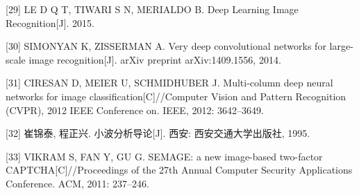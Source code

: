 \documentclass[bachelor,zhspacing]{cqu}  %
\begin{document}
\hypertarget{ref-le2015deep}{}
{[}29{]} LE D Q T, TIWARI S N, MERIALDO B. Deep Learning Image
Recognition{[}J{]}. 2015.

\hypertarget{ref-simonyan2014very}{}
{[}30{]} SIMONYAN K, ZISSERMAN A. Very deep convolutional networks for
large-scale image recognition{[}J{]}. arXiv preprint arXiv:1409.1556,
2014.

\hypertarget{ref-ciresan2012multi}{}
{[}31{]} CIRESAN D, MEIER U, SCHMIDHUBER J. Multi-column deep neural
networks for image classification{[}C{]}//Computer Vision and Pattern
Recognition (CVPR), 2012 IEEE Conference on. IEEE, 2012: 3642--3649.

\hypertarget{ref-ux5d14ux9526ux6cf01995ux5c0fux6ce2ux5206ux6790ux5bfcux8bba}{}
{[}32{]} 崔锦泰, 程正兴. 小波分析导论{[}J{]}. 西安: 西安交通大学出版社,
1995.

\hypertarget{ref-vikram2011semage}{}
{[}33{]} VIKRAM S, FAN Y, GU G. SEMAGE: a new image-based two-factor
CAPTCHA{[}C{]}//Proceedings of the 27th Annual Computer Security
Applications Conference. ACM, 2011: 237--246.

%




\end{document}
